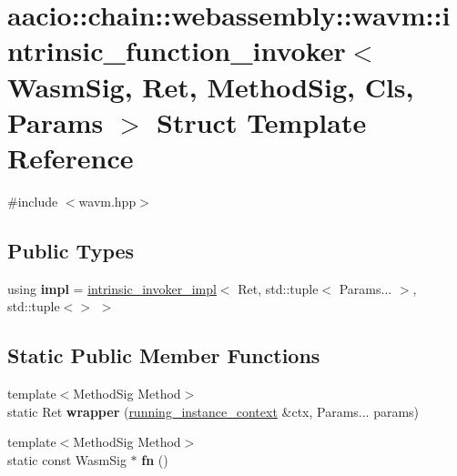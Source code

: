 \hypertarget{structaacio_1_1chain_1_1webassembly_1_1wavm_1_1intrinsic__function__invoker}{}\section{aacio\+:\+:chain\+:\+:webassembly\+:\+:wavm\+:\+:intrinsic\+\_\+function\+\_\+invoker$<$ Wasm\+Sig, Ret, Method\+Sig, Cls, Params $>$ Struct Template Reference}
\label{structaacio_1_1chain_1_1webassembly_1_1wavm_1_1intrinsic__function__invoker}


{\ttfamily \#include $<$wavm.\+hpp$>$}

\subsection*{Public Types}
\begin{DoxyCompactItemize}
\item 
\mbox{\label{structaacio_1_1chain_1_1webassembly_1_1wavm_1_1intrinsic__function__invoker_a1f1dee3146ee09ec90152060caae1913}} 
using {\bfseries impl} = \mbox{\hyperlink{structaacio_1_1chain_1_1webassembly_1_1wavm_1_1intrinsic__invoker__impl}{intrinsic\+\_\+invoker\+\_\+impl}}$<$ Ret, std\+::tuple$<$ Params... $>$, std\+::tuple$<$$>$ $>$
\end{DoxyCompactItemize}
\subsection*{Static Public Member Functions}
\begin{DoxyCompactItemize}
\item 
\mbox{\label{structaacio_1_1chain_1_1webassembly_1_1wavm_1_1intrinsic__function__invoker_a71f2779e971aeeac3f0659e4fbb52114}} 
{\footnotesize template$<$Method\+Sig Method$>$ }\\static Ret {\bfseries wrapper} (\mbox{\hyperlink{structaacio_1_1chain_1_1webassembly_1_1wavm_1_1running__instance__context}{running\+\_\+instance\+\_\+context}} \&ctx, Params... params)
\item 
\mbox{\label{structaacio_1_1chain_1_1webassembly_1_1wavm_1_1intrinsic__function__invoker_ad35c48b4f9d395be60cdec2e02ffea2a}} 
{\footnotesize template$<$Method\+Sig Method$>$ }\\static const Wasm\+Sig $\ast$ {\bfseries fn} ()
\end{DoxyCompactItemize}



